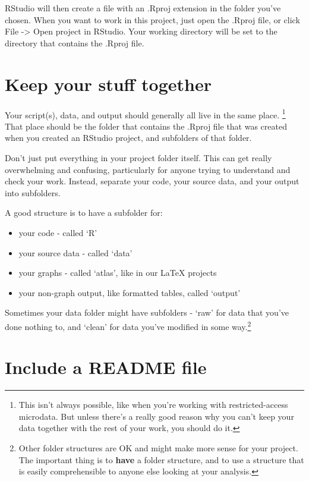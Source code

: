 \documentclass[]{book}
\providecommand{\tightlist}{%
  \setlength{\itemsep}{0pt}\setlength{\parskip}{0pt}}
\let\rmarkdownfootnote\footnote%
\def\footnote{\protect\rmarkdownfootnote}
\begin{document}
RStudio will then create a file with an .Rproj extension in the folder you've chosen. When you want to work in this project, just open the .Rproj file, or click File -\textgreater{} Open project in RStudio. Your working directory will be set to the directory that contains the .Rproj file.

\hypertarget{keep-your-stuff-together}{%
\section{Keep your stuff together}\label{keep-your-stuff-together}}

Your script(s), data, and output should generally all live in the same place. \footnote{This isn't always possible, like when you're working with restricted-access microdata. But unless there's a really good reason why you can't keep your data together with the rest of your work, you should do it.} That place should be the folder that contains the .Rproj file that was created when you created an RStudio project, and subfolders of that folder.

Don't just put everything in your project folder itself. This can get really overwhelming and confusing, particularly for anyone trying to understand and check your work. Instead, separate your code, your source data, and your output into subfolders.

A good structure is to have a subfolder for:

\begin{itemize}
\tightlist
\item
  your code - called `R'
\item
  your source data - called `data'
\item
  your graphs - called `atlas', like in our LaTeX projects
\item
  your non-graph output, like formatted tables, called `output'
\end{itemize}

Sometimes your data folder might have subfolders - `raw' for data that you've done nothing to, and `clean' for data you've modified in some way.\footnote{Other folder structures are OK and might make more sense for your project. The important thing is to \textbf{have} a folder structure, and to use a structure that is easily comprehensible to anyone else looking at your analysis.}

\hypertarget{include-a-readme-file}{%
\section{Include a README file}\label{include-a-readme-file}}
\end{document}
